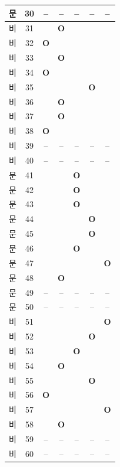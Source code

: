 \documentclass[10pt, a4paper]{article}
\begin{document}
\begin{tabularx}{\textwidth}{|c|c|c|c|c|c|c|}
\hline
[3]문 & 30 & -- & -- & -- & -- & -- \\
\hline
[4]비 & 31 &  & \textbf{O} &  &  &  \\
\hline
[4]비 & 32 & \textbf{O} &  &  &  &  \\
\hline
[4]비 & 33 &  & \textbf{O} &  &  &  \\
\hline
[4]비 & 34 & \textbf{O} &  &  &  &  \\
\hline
[4]비 & 35 &  &  &  & \textbf{O} &  \\
\hline
[4]비 & 36 &  & \textbf{O} &  &  &  \\
\hline
[4]비 & 37 &  & \textbf{O} &  &  &  \\
\hline
[4]비 & 38 & \textbf{O} &  &  &  &  \\
\hline
[4]비 & 39 & -- & -- & -- & -- & -- \\
\hline
[4]비 & 40 & -- & -- & -- & -- & -- \\
\hline
[5]문 & 41 &  &  & \textbf{O} &  &  \\
\hline
[5]문 & 42 &  &  & \textbf{O} &  &  \\
\hline
[5]문 & 43 &  &  & \textbf{O} &  &  \\
\hline
[5]문 & 44 &  &  &  & \textbf{O} &  \\
\hline
[5]문 & 45 &  &  &  & \textbf{O} &  \\
\hline
[5]문 & 46 &  &  & \textbf{O} &  &  \\
\hline
[5]문 & 47 &  &  &  &  & \textbf{O} \\
\hline
[5]문 & 48 &  & \textbf{O} &  &  &  \\
\hline
[5]문 & 49 & -- & -- & -- & -- & -- \\
\hline
[5]문 & 50 & -- & -- & -- & -- & -- \\
\hline
[6]비 & 51 &  &  &  &  & \textbf{O} \\
\hline
[6]비 & 52 &  &  &  & \textbf{O} &  \\
\hline
[6]비 & 53 &  &  & \textbf{O} &  &  \\
\hline
[6]비 & 54 &  & \textbf{O} &  &  &  \\
\hline
[6]비 & 55 &  &  &  & \textbf{O} &  \\
\hline
[6]비 & 56 & \textbf{O} &  &  &  &  \\
\hline
[6]비 & 57 &  &  &  &  & \textbf{O} \\
\hline
[6]비 & 58 &  & \textbf{O} &  &  &  \\
\hline
[6]비 & 59 & -- & -- & -- & -- & -- \\
\hline
[6]비 & 60 & -- & -- & -- & -- & -- \\
\hline
\end{tabularx}
\vspace{5mm}
\end{document}
